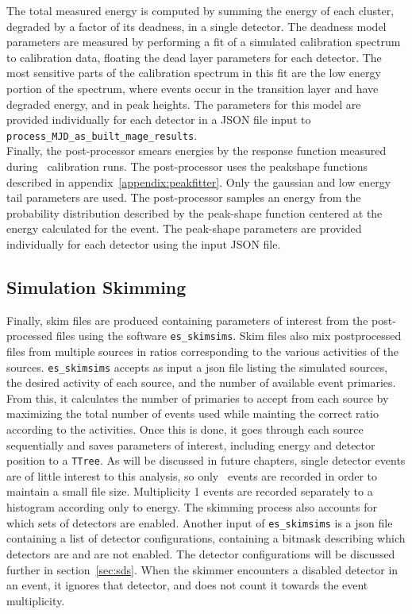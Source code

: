 \documentclass[/main.tex]{subfiles}
\begin{document}
The total measured energy is computed by summing the energy of each cluster, degraded by a factor of its deadness, in a single detector.
The deadness model parameters are measured by performing a fit of a simulated  calibration spectrum to calibration data, floating the dead layer parameters for each detector.
The most sensitive parts of the calibration spectrum in this fit are the low energy portion of the spectrum, where events occur in the transition layer and have degraded energy, and in peak heights.
The parameters for this model are provided individually for each detector in a JSON file input to \texttt{process\_MJD\_as\_built\_mage\_results}.
\\
Finally, the post-processor smears energies by the response function measured during \ calibration runs.
The post-processor uses the peakshape functions described in appendix~\ref{appendix:peakfitter}.
Only the gaussian and low energy tail parameters are used.
The post-processor samples an energy from the probability distribution described by the peak-shape function centered at the energy calculated for the event.
The peak-shape parameters are provided individually for each detector using the input JSON file.

\subsection{Simulation Skimming} \label{sec:simskim}
Finally, skim files are produced containing parameters of interest from the post-processed files using the software \texttt{es\_skimsims}.
Skim files also mix postprocessed files from multiple sources in ratios corresponding to the various activities of the sources.
\texttt{es\_skimsims} accepts as input a json file listing the simulated sources, the desired activity of each source, and the number of available event primaries.
From this, it calculates the number of primaries to accept from each source by maximizing the total number of events used while mainting the correct ratio according to the activities.
Once this is done, it goes through each source sequentially and saves parameters of interest, including energy and detector position to a \texttt{TTree}.
As will be discussed in future chapters, single detector events are of little interest to this analysis, so only \msmd\ events are recorded in order to maintain a small file size.
Multiplicity 1 events are recorded separately to a histogram according only to energy.
The skimming process also accounts for which sets of detectors are enabled.
Another input of \texttt{es\_skimsims} is a json file containing a list of detector configurations, containing a bitmask describing which detectors are and are not enabled.
The detector configurations will be discussed further in section~\ref{sec:sds}.
When the skimmer encounters a disabled detector in an event, it ignores that detector, and does not count it towards the event multiplicity.
\\
 
\end{document}

